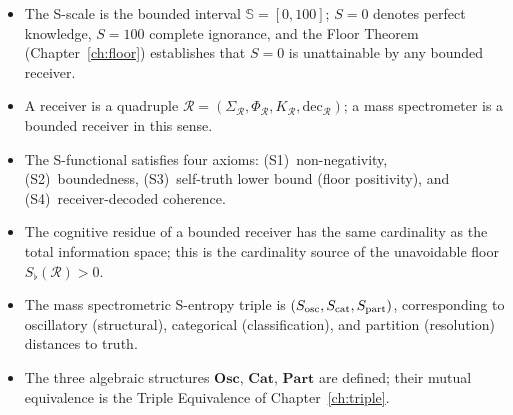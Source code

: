 \bigskip
\begin{tcolorbox}[colback=crownblue!5, colframe=crownblue!60!black,
                  title={\textbf{Chapter 13 Summary}}]
\begin{itemize}[noitemsep]
  \item The S-scale is the bounded interval $\mathbb{S} = [0,100]$; $S=0$
    denotes perfect knowledge, $S=100$ complete ignorance, and the Floor
    Theorem (Chapter~\ref{ch:floor}) establishes that $S=0$ is
    unattainable by any bounded receiver.
  \item A receiver is a quadruple
    $\mathcal{R} = (\Sigma_{\mathcal{R}}, \Phi_{\mathcal{R}},
    K_{\mathcal{R}}, \mathrm{dec}_{\mathcal{R}})$; a mass spectrometer is a
    bounded receiver in this sense.
  \item The S-functional satisfies four axioms: (S1)~non-negativity,
    (S2)~boundedness, (S3)~self-truth lower bound (floor positivity),
    and (S4)~receiver-decoded coherence.
  \item The cognitive residue of a bounded receiver has the same cardinality as
    the total information space; this is the cardinality source of the
    unavoidable floor $S_{\flat}(\mathcal{R}) > 0$.
  \item The mass spectrometric S-entropy triple is $(S_{\mathrm{osc}}, S_{\mathrm{cat}}, S_{\mathrm{part}})$,
    corresponding to oscillatory (structural), categorical (classification),
    and partition (resolution) distances to truth.
  \item The three algebraic structures $\mathbf{Osc}$, $\mathbf{Cat}$,
    $\mathbf{Part}$ are defined; their mutual equivalence is the Triple
    Equivalence of Chapter~\ref{ch:triple}.
\end{itemize}
\end{tcolorbox}
